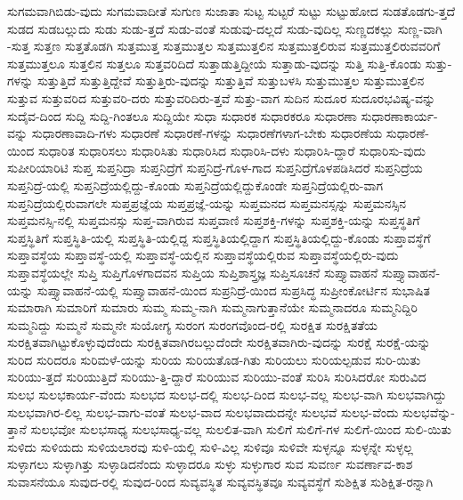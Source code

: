 {ಸುಗಮವಾಗಿಬಿಡು-ವುದು
ಸುಗಮವಾದೀತೆ
ಸುಗುಣ
ಸುಜಾತಾ
ಸುಟ್ಟ
ಸುಟ್ಟರೆ
ಸುಟ್ಟು
ಸುಟ್ಟುಹೋದ
ಸುಡತೊಡಗು-ತ್ತದೆ
ಸುಡದ
ಸುಡಬಲ್ಲುದು
ಸುಡು
ಸುಡು-ತ್ತದೆ
ಸುಡು-ವಂತೆ
ಸುಡುವು-ದಲ್ಲದೆ
ಸುಡು-ವುದಿಲ್ಲ
ಸುಣ್ಣದಕಲ್ಲು
ಸುಣ್ಣ-ವಾಗಿ
-ಸುತ್ತ
ಸುತ್ತಣ
ಸುತ್ತತೊಡಗಿ
ಸುತ್ತಮುತ್ತ
ಸುತ್ತಮುತ್ತಲ
ಸುತ್ತಮುತ್ತಲಿನ
ಸುತ್ತಮುತ್ತಲಿರುವ
ಸುತ್ತಮುತ್ತಲಿರುವವರಿಗೆ
ಸುತ್ತಮುತ್ತಲೂ
ಸುತ್ತಲಿನ
ಸುತ್ತಲೂ
ಸುತ್ತವರಿದಿದೆ
ಸುತ್ತಾಡುತ್ತಿದ್ದೀಯೆ
ಸುತ್ತಾಡು-ವುದನ್ನು
ಸುತ್ತಿ
ಸುತ್ತಿ-ಕೊಂಡು
ಸುತ್ತು-ಗಳನ್ನು
ಸುತ್ತುತ್ತಿದೆ
ಸುತ್ತುತ್ತಿದ್ದೇವೆ
ಸುತ್ತುತ್ತಿರು-ವುದನ್ನು
ಸುತ್ತುತ್ತಿವೆ
ಸುತ್ತುಬಳಸಿ
ಸುತ್ತುಮುತ್ತಲ
ಸುತ್ತುಮುತ್ತಲಿನ
ಸುತ್ತುವ
ಸುತ್ತುವರಿದ
ಸುತ್ತುವರಿ-ದರು
ಸುತ್ತುವರಿದಿರು-ತ್ತವೆ
ಸುತ್ತು-ವಾಗ
ಸುದಿನ
ಸುದೂರ
ಸುದೂರಭವಿಷ್ಯ-ವನ್ನು
ಸುದೈವ-ದಿಂದ
ಸುದ್ದಿ
ಸುದ್ದಿ-ಗಿಂತಲೂ
ಸುದ್ದಿಯೇ
ಸುಧಾ
ಸುಧಾರಕ
ಸುಧಾರಕರೂ
ಸುಧಾರಣಾ
ಸುಧಾರಣಾಕಾರ್ಯ-ವನ್ನು
ಸುಧಾರಣಾವಾದಿ-ಗಳು
ಸುಧಾರಣೆ
ಸುಧಾರಣೆ-ಗಳನ್ನು
ಸುಧಾರಣೆಗಳಾಗ-ಬೇಕು
ಸುಧಾರಣೆಯ
ಸುಧಾರಣೆ-ಯಿಂದ
ಸುಧಾರಿತ
ಸುಧಾರಿಸಲು
ಸುಧಾರಿಸಿತು
ಸುಧಾರಿಸಿದ
ಸುಧಾರಿಸಿ-ದಳು
ಸುಧಾರಿಸಿ-ದ್ದಾರೆ
ಸುಧಾರಿಸು-ವುದು
ಸುಪೀರಿಯಾರಿಟಿ
ಸುಪ್ತ
ಸುಪ್ತನಿದ್ರಾ
ಸುಪ್ತನಿದ್ರೆಗೆ
ಸುಪ್ತನಿದ್ರೆ-ಗೊಳ-ಗಾದ
ಸುಪ್ತನಿದ್ರೆಗೊಳಪಡಿಸಿದರೆ
ಸುಪ್ತನಿದ್ರೆಯ
ಸುಪ್ತನಿದ್ರೆ-ಯಲ್ಲಿ
ಸುಪ್ತನಿದ್ರೆಯಲ್ಲಿದ್ದು-ಕೊಂಡು
ಸುಪ್ತನಿದ್ರೆಯಲ್ಲಿದ್ದುಕೊಂಡೇ
ಸುಪ್ತನಿದ್ರೆಯಲ್ಲಿರು-ವಾಗ
ಸುಪ್ತನಿದ್ರೆಯಲ್ಲಿರುವಾಗಲೇ
ಸುಪ್ತಪ್ರಜ್ಞೆಯ
ಸುಪ್ತಪ್ರಜ್ಞೆ-ಯನ್ನು
ಸುಪ್ತಮನದ
ಸುಪ್ತಮನಸ್ಸನ್ನು
ಸುಪ್ತಮನಸ್ಸಿನ
ಸುಪ್ತಮನಸ್ಸಿ-ನಲ್ಲಿ
ಸುಪ್ತಮನಸ್ಸು
ಸುಪ್ತ-ವಾಗಿರುವ
ಸುಪ್ತವಾಣಿ
ಸುಪ್ತಶಕ್ತಿ-ಗಳನ್ನು
ಸುಪ್ತಶಕ್ತಿ-ಯನ್ನು
ಸುಪ್ತಸ್ಥತಿಗೆ
ಸುಪ್ತಸ್ಥಿತಿಗೆ
ಸುಪ್ತಸ್ಥಿತಿ-ಯಲ್ಲಿ
ಸುಪ್ತಸ್ಥಿತಿ-ಯಲ್ಲಿದ್ದ
ಸುಪ್ತಸ್ಥಿತಿಯಲ್ಲಿದ್ದಾಗ
ಸುಪ್ತಸ್ಥಿತಿಯಲ್ಲಿದ್ದು-ಕೊಂಡು
ಸುಪ್ತಾವಸ್ಥೆಗೆ
ಸುಪ್ತಾವಸ್ಥೆಯ
ಸುಪ್ತಾವಸ್ಥೆ-ಯಲ್ಲಿ
ಸುಪ್ತಾವಸ್ಥೆ-ಯಲ್ಲಿನ
ಸುಪ್ತಾವಸ್ಥೆಯಲ್ಲಿರುವ
ಸುಪ್ತಾವಸ್ಥೆಯಲ್ಲಿರು-ವುದು
ಸುಪ್ತಾವಸ್ಥೆಯಲ್ಲೇ
ಸುಪ್ತಿ
ಸುಪ್ತಿಗೊಳಗಾದವನ
ಸುಪ್ತಿಯ
ಸುಪ್ತಿಶಾಸ್ತ್ರಜ್ಞ
ಸುಪ್ತಿಸೂಚನೆ
ಸುಪ್ತ್ಯಾವಾಹನೆ
ಸುಪ್ತ್ಯಾವಾಹನೆ-ಯನ್ನು
ಸುಪ್ತ್ಯಾವಾಹನೆ-ಯಲ್ಲಿ
ಸುಪ್ತ್ಯಾವಾಹನೆ-ಯಿಂದ
ಸುಪ್ರನಿದ್ರೆ-ಯಿಂದ
ಸುಪ್ರಸಿದ್ಧ
ಸುಪ್ರೀಂಕೋರ್ಟಿನ
ಸುಭಾಷಿತ
ಸುಮಾರಾಗಿ
ಸುಮಾರಿಗೆ
ಸುಮಾರು
ಸುಮ್ಮ
ಸುಮ್ಮ-ನಾಗಿ
ಸುಮ್ಮನಾಗುತ್ತಾನೆಯೇ
ಸುಮ್ಮನಾದರೂ
ಸುಮ್ಮನಿದ್ದಿರಿ
ಸುಮ್ಮನಿದ್ದು
ಸುಮ್ಮನೆ
ಸುಮ್ಮನೇ
ಸುಯೋಗ್ಯ
ಸುರಂಗ
ಸುರಂಗವೊಂದ-ರಲ್ಲಿ
ಸುರಕ್ಷಿತ
ಸುರಕ್ಷಿತತೆಯ
ಸುರಕ್ಷಿತವಾಗಿಟ್ಟುಕೊಳ್ಳುವುದೆಂದು
ಸುರಕ್ಷಿತವಾಗಿರಬಲ್ಲುದೆಂದೇ
ಸುರಕ್ಷಿತವಾಗಿರು-ವುದನ್ನು
ಸುರಕ್ಷೆ
ಸುರಕ್ಷೆ-ಯನ್ನು
ಸುರಿದ
ಸುರಿದರೂ
ಸುರಿಮಳೆ-ಯನ್ನು
ಸುರಿಯ
ಸುರಿಯತೊಡ-ಗಿತು
ಸುರಿಯಲು
ಸುರಿಯಲ್ಪಡುವ
ಸುರಿ-ಯಿತು
ಸುರಿಯು-ತ್ತದೆ
ಸುರಿಯುತ್ತಿದೆ
ಸುರಿಯು-ತ್ತಿ-ದ್ದಾರೆ
ಸುರಿಯುವ
ಸುರಿಯು-ವಂತೆ
ಸುರಿಸಿ
ಸುರಿಸಿದರೋ
ಸುರುವಿದ
ಸುಲಭ
ಸುಲಭಕಾರ್ಯ-ವೆಂದು
ಸುಲಭದ
ಸುಲಭ-ದಲ್ಲಿ
ಸುಲಭ-ದಿಂದ
ಸುಲಭ-ವಲ್ಲ
ಸುಲಭ-ವಾಗಿ
ಸುಲಭವಾಗಿದ್ದು
ಸುಲಭವಾಗಿರ-ಲಿಲ್ಲ
ಸುಲಭ-ವಾಗು-ವಂತೆ
ಸುಲಭ-ವಾದ
ಸುಲಭವಾದುದನ್ನೇ
ಸುಲಭವೆ
ಸುಲಭ-ವೆಂದು
ಸುಲಭವೆನ್ನು-ತ್ತಾನೆ
ಸುಲಭವೋ
ಸುಲಭಸಾಧ್ಯ
ಸುಲಭಸಾಧ್ಯ-ವಲ್ಲ
ಸುಲಲಿತ-ವಾಗಿ
ಸುಲಿಗೆ
ಸುಲಿಗೆ-ಗಳ
ಸುಲಿಗೆ-ಯಿಂದ
ಸುಲಿ-ಯಿತು
ಸುಳಿದು
ಸುಳಿಯದು
ಸುಳಿಯಲಾರವು
ಸುಳಿ-ಯಲ್ಲಿ
ಸುಳಿ-ವಿಲ್ಲ
ಸುಳಿವೂ
ಸುಳಿವೇ
ಸುಳ್ಳನ್ನೂ
ಸುಳ್ಳನ್ನೇ
ಸುಳ್ಳಲ್ಲ
ಸುಳ್ಳಾಗಲು
ಸುಳ್ಳಾಗಿತ್ತು
ಸುಳ್ಳಾಡಿದನೆಂದು
ಸುಳ್ಳಾದರೂ
ಸುಳ್ಳು
ಸುಳ್ಳುಗಾರ
ಸುವ
ಸುವರ್ಣ
ಸುವರ್ಣಾವ-ಕಾಶ
ಸುವಾಸನೆಯೂ
ಸುವುದ-ರಲ್ಲಿ
ಸುವುದ-ರಿಂದ
ಸುವ್ಯವಸ್ಥಿತ
ಸುವ್ಯವಸ್ಥಿತವೂ
ಸುವ್ಯವಸ್ಥೆಗೆ
ಸುಶಿಕ್ಷಿತ
ಸುಶಿಕ್ಷಿತ-ರನ್ನಾಗಿ
}
